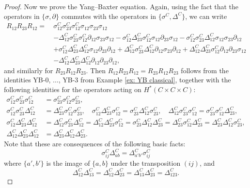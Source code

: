\documentclass[10pt]{amsart}
\newcommand{\+}{{}^+}
\theoremstyle{definition}
\theoremstyle {definition}
\theoremstyle {definition}
\begin{document}
\begin{proof}
Now we prove the Yang--Baxter equation. Again, using the fact that the operators in $\{\sigma,\partial\}$ commutes with the operators in $\{\sigma^C, \Delta^C\}$, we can write
\begin{align*}
    R_{12}R_{23}R_{12}=\ &\sigma^C_{12}\sigma_{23}^C\sigma_{12}^C\sigma_{12}\sigma_{23}\sigma_{12}\\
    &-\Delta^C_{12}\sigma_{23}^C\sigma_{12}^C\partial_{12}\sigma_{23}\sigma_{12}
    -\sigma^C_{12}\Delta_{23}^C\sigma_{12}^C\sigma_{12}\partial_{23}\sigma_{12}
    -\sigma^C_{12}\sigma_{23}^C\Delta_{12}^C\sigma_{12}\sigma_{23}\partial_{12}\\
    &+\sigma^C_{12}\Delta_{23}^C\Delta_{12}^C\sigma_{12}\partial_{23}\partial_{12}
    +\Delta^C_{12}\sigma_{23}^C\Delta_{12}^C\partial_{12}\sigma_{23}\partial_{12}
    +\Delta^C_{12}\Delta_{23}^C\sigma_{12}^C\partial_{12}\partial_{23}\sigma_{12}\\
    &-\Delta^C_{12}\Delta_{23}^C\Delta_{12}^C\partial_{12}\partial_{23}\partial_{12},
\end{align*}
and similarly for $R_{23}R_{12}R_{23}$. Then $R_{12}R_{23}R_{12}=R_{23}R_{12}R_{23}$ follows from the identities YB-0, $\dots$, YB-3 from Example \ref{ex: YB classical}, together with the following identities for the operators acting on $H^*(C\times C\times C)$:
\begin{align*}
    \sigma^C_{12}\sigma^C_{23}\sigma^C_{12} &= \sigma^C_{23}\sigma^C_{12}\sigma^C_{23}, \\
    \sigma^C_{12}\sigma^C_{23}\Delta^C_{12} &=  \Delta^C_{23}\sigma^C_{12}\sigma^C_{23},\quad
    \sigma^C_{12}\Delta^C_{23}\sigma^C_{12}= \sigma^C_{23}\Delta^C_{12}\sigma^C_{23},\quad
    \Delta^C_{12}\sigma^C_{23}\sigma^C_{12} = \sigma^C_{23}\sigma^C_{12}\Delta^C_{23}, \\
    \sigma^C_{12}\Delta^C_{23}\Delta^C_{12} &= \Delta^C_{12}\sigma^C_{23}\Delta^C_{12} = \Delta^C_{12}\Delta^C_{23}\sigma^C_{12} = \sigma^C_{23}\Delta^C_{12}\Delta^C_{23} = \Delta^C_{23}\sigma^C_{12}\Delta^C_{23} = \Delta^C_{23}\Delta^C_{12}\sigma^C_{23}, \\
    \Delta^C_{12}\Delta^C_{23}\Delta^C_{12} &= \Delta^C_{23}\Delta^C_{12}\Delta^C_{23}.
\end{align*}
Note that these are consequences of the following basic facts:
$$\sigma^C_{ij}\Delta^C_{ab}=\Delta^C_{a'b'}\sigma^C_{ij}
$$
where $\{a',b'\}$ is the image of $\{a,b\}$ under the transposition $(ij)$, and 
$$\Delta^C_{12}\Delta^C_{13}=\Delta^C_{12}\Delta^C_{23}=\Delta^C_{13}\Delta^C_{23}=\Delta^C_{123}.
$$
\end{proof}
\end{document}

